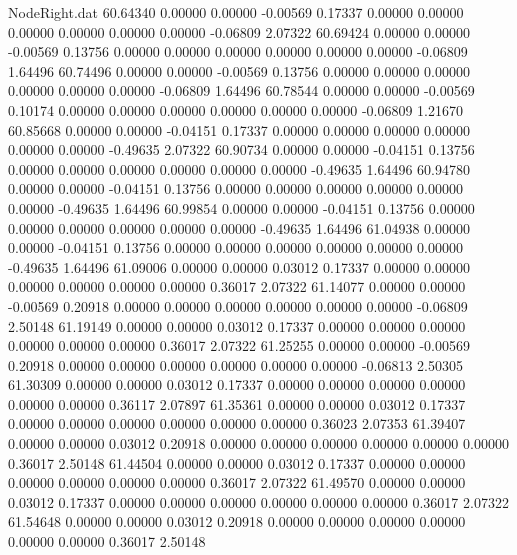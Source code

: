 \begin{filecontents}{NodeRight.dat}
  60.64340    0.00000    0.00000    -0.00569    0.17337    0.00000    0.00000    0.00000    0.00000    0.00000    0.00000   -0.06809    2.07322
  60.69424    0.00000    0.00000    -0.00569    0.13756    0.00000    0.00000    0.00000    0.00000    0.00000    0.00000   -0.06809    1.64496
  60.74496    0.00000    0.00000    -0.00569    0.13756    0.00000    0.00000    0.00000    0.00000    0.00000    0.00000   -0.06809    1.64496
  60.78544    0.00000    0.00000    -0.00569    0.10174    0.00000    0.00000    0.00000    0.00000    0.00000    0.00000   -0.06809    1.21670
  60.85668    0.00000    0.00000    -0.04151    0.17337    0.00000    0.00000    0.00000    0.00000    0.00000    0.00000   -0.49635    2.07322
  60.90734    0.00000    0.00000    -0.04151    0.13756    0.00000    0.00000    0.00000    0.00000    0.00000    0.00000   -0.49635    1.64496
  60.94780    0.00000    0.00000    -0.04151    0.13756    0.00000    0.00000    0.00000    0.00000    0.00000    0.00000   -0.49635    1.64496
  60.99854    0.00000    0.00000    -0.04151    0.13756    0.00000    0.00000    0.00000    0.00000    0.00000    0.00000   -0.49635    1.64496
  61.04938    0.00000    0.00000    -0.04151    0.13756    0.00000    0.00000    0.00000    0.00000    0.00000    0.00000   -0.49635    1.64496
  61.09006    0.00000    0.00000     0.03012    0.17337    0.00000    0.00000    0.00000    0.00000    0.00000    0.00000    0.36017    2.07322
  61.14077    0.00000    0.00000    -0.00569    0.20918    0.00000    0.00000    0.00000    0.00000    0.00000    0.00000   -0.06809    2.50148
  61.19149    0.00000    0.00000     0.03012    0.17337    0.00000    0.00000    0.00000    0.00000    0.00000    0.00000    0.36017    2.07322
  61.25255    0.00000    0.00000    -0.00569    0.20918    0.00000    0.00000    0.00000    0.00000    0.00000    0.00000   -0.06813    2.50305
  61.30309    0.00000    0.00000     0.03012    0.17337    0.00000    0.00000    0.00000    0.00000    0.00000    0.00000    0.36117    2.07897
  61.35361    0.00000    0.00000     0.03012    0.17337    0.00000    0.00000    0.00000    0.00000    0.00000    0.00000    0.36023    2.07353
  61.39407    0.00000    0.00000     0.03012    0.20918    0.00000    0.00000    0.00000    0.00000    0.00000    0.00000    0.36017    2.50148
  61.44504    0.00000    0.00000     0.03012    0.17337    0.00000    0.00000    0.00000    0.00000    0.00000    0.00000    0.36017    2.07322
  61.49570    0.00000    0.00000     0.03012    0.17337    0.00000    0.00000    0.00000    0.00000    0.00000    0.00000    0.36017    2.07322
  61.54648    0.00000    0.00000     0.03012    0.20918    0.00000    0.00000    0.00000    0.00000    0.00000    0.00000    0.36017    2.50148

\end{filecontents}
